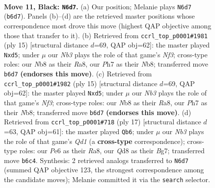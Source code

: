 \documentclass[11pt]{article}
\begin{document}
\clearpage

\begin{figure}[p]\centering
\begin{subfigure}{0.46\textwidth}\centering
\resizebox{\linewidth}{!}{%
\newchessgame
\chessboard[
  setfen={rnbq1rk1/pp3pbp/1n2p1p1/3p4/P2P4/1B1Q1N2/1PP2PPP/RNB1R1K1 b - - 0 11},
  showmover=false,
  pgfstyle=straightmove, color=movearrow, markmove={b6-d7}
]}
\caption{}
\end{subfigure}\hfill
\begin{subfigure}{0.46\textwidth}\centering
\resizebox{\linewidth}{!}{%
\newchessgame
\chessboard[
  setfen={rn1q1rk1/pbp1ppbp/1p3np1/3P4/3P4/5NP1/PPQ1PPBP/RNB2RK1 b - - 0 8},
  showmover=false,
  pgfstyle=straightmove, color=movearrow, markmove={f6-d5}
]}
\caption{}
\end{subfigure}
\\[4pt]
\begin{subfigure}{0.46\textwidth}\centering
\resizebox{\linewidth}{!}{%
\newchessgame
\chessboard[
  setfen={rn1q1rk1/pbp1ppbp/1p3np1/3P4/3P4/5NP1/PPQ1PPBP/RNB2RK1 b - - 0 8},
  showmover=false,
  pgfstyle=straightmove, color=movearrow, markmove={f6-d5}
]}
\caption{}
\end{subfigure}\hfill
\begin{subfigure}{0.46\textwidth}\centering
\resizebox{\linewidth}{!}{%
\newchessgame
\chessboard[
  setfen={r1bq1rk1/pp2ppbp/n4np1/2pP4/4P3/1QN2N2/PP3PPP/R1B1KB1R b KQ - 0 9},
  showmover=false,
  pgfstyle=straightmove, color=movearrow, markmove={d8-b6}
]}
\caption{}
\end{subfigure}
\caption{\textbf{Move 11, Black: \texttt{N6d7}.} (a) Our position; Melanie plays \texttt{N6d7} (\texttt{b6d7}). Panels (b)--(d) are the retrieved master positions whose correspondence most drove this move (highest QAP objective among those that transfer to it). (b) Retrieved from \texttt{ccrl\_top\_p0001\#1981} (ply 15) [structural distance $d$=69, QAP obj=62]: the master played \texttt{Nxd5}; under $\mu$ our \emph{Nb3} plays the role of that game's \emph{Nf3}; cross-type roles: our \emph{N}b8 as their \emph{R}a8, our \emph{P}h7 as their \emph{N}b8; transferred move \texttt{b6d7} \textbf{(endorses this move)}. (c) Retrieved from \texttt{ccrl\_top\_p0001\#1982} (ply 15) [structural distance $d$=69, QAP obj=62]: the master played \texttt{Nxd5}; under $\mu$ our \emph{Nb3} plays the role of that game's \emph{Nf3}; cross-type roles: our \emph{N}b8 as their \emph{R}a8, our \emph{P}h7 as their \emph{N}b8; transferred move \texttt{b6d7} \textbf{(endorses this move)}. (d) Retrieved from \texttt{ccrl\_top\_p0001\#718} (ply 17) [structural distance $d$=63, QAP obj=61]: the master played \texttt{Qb6}; under $\mu$ our \emph{Nb3} plays the role of that game's \emph{Qd1} (a \textbf{cross-type} correspondence); cross-type roles: our \emph{P}e6 as their \emph{R}a8, our \emph{Q}d8 as their \emph{B}g7; transferred move \texttt{b6c4}. Synthesis: 2 retrieved analogs transferred to \texttt{N6d7} (summed QAP objective 123, the strongest correspondence among the candidate moves); Melanie committed it via the \texttt{search} selector.}
\label{fig:thought-m21}
\end{figure}
\end{document}
